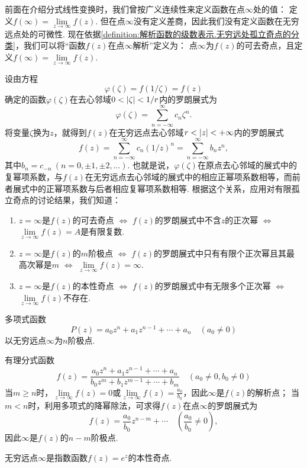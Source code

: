前面在介绍分式线性变换时，我们曾按广义连续性来定义函数在点\(\infty\)处的值：
定义\(f(\infty) = \lim\limits_{z\to\infty} f(z)\).
但在点\(\infty\)没有定义差商，因此我们没有定义函数在无穷远点处的可微性.
现在依据\cref{definition:解析函数的级数表示.无穷远处孤立奇点的分类}，我们可以将“函数\(f(z)\)在点\(\infty\)解析”定义为：
点\(\infty\)为\(f(z)\)的可去奇点，且定义\(f(\infty) = \lim\limits_{z\to\infty} f(z)\).

设由方程\[
\varphi(\zeta) = f(1/\zeta) = f(z)
\]确定的函数\(\varphi(\zeta)\)在去心邻域\(0<\abs{\zeta}<1/r\)内的罗朗展式为\[
\varphi(\zeta) = \sum\limits_{n=-\infty}^{\infty} c_n \zeta^n.
\]将变量\(\zeta\)换为\(z\)，就得到\(f(z)\)在无穷远点去心邻域\(r<\abs{z}<+\infty\)内的罗朗展式\[
f(z) = \sum\limits_{n=-\infty}^{\infty} c_n (1/z)^n
= \sum\limits_{n=-\infty}^{\infty} b_n z^n,
\]其中\(b_n = c_{-n}\ (n=0,\pm1,\pm2,\dotsc)\).
也就是说，\(\varphi(\zeta)\)在原点去心邻域的展式中的复幂项系数，与\(f(z)\)在无穷远点去心邻域的展式中的相应正幂项系数相等，而前者展式中的正幂项系数与后者相应复幂项系数相等.
根据这个关系，应用对有限孤立奇点的讨论结果，我们知道：
\begin{enumerate}
\item \(z=\infty\)是\(f(z)\)的可去奇点 \(\iff\) \(f(z)\)的罗朗展式中不含\(z\)的正次幂 \(\iff\) \(\lim\limits_{z\to\infty} f(z) = A\)是有限复数.
\item \(z=\infty\)是\(f(z)\)的\(m\)阶极点 \(\iff\) \(f(z)\)的罗朗展式中只有有限个正次幂且其最高次幂是\(m\) \(\iff\) \(\lim\limits_{z\to\infty} f(z) = \infty\).
\item \(z=\infty\)是\(f(z)\)的本性奇点 \(\iff\) \(f(z)\)的罗朗展式中有无限多个正次幂 \(\iff\) \(\lim\limits_{z\to\infty} f(z)\)不存在.
\end{enumerate}

\begin{example}
多项式函数\[
P(z) = a_0 z^n + a_1 z^{n-1} + \dotsb + a_n
\quad(a_0\neq0)
\]以无穷远点\(\infty\)为\(n\)阶极点.
\end{example}

\begin{example}
有理分式函数\[
f(z) = \frac{a_0 z^n + a_1 z^{n-1} + \dotsb + a_n}{b_0 z^m + b_1 z^{m-1} + \dotsb + b_m}
\quad(a_0\neq0,b_0\neq0)
\]当\(m \geqslant n\)时，\(\lim\limits_{z\to\infty} f(z) = 0\)或\(\lim\limits_{z\to\infty} f(z) = \frac{a_0}{b_0}\)，因此\(\infty\)是\(f(z)\)的解析点；
当\(m<n\)时，利用多项式的降幂除法，可求得\(f(z)\)在点\(\infty\)的罗朗展式为\[
f(z) = \frac{a_0}{b_0} z^{n-m} + \dotsb
\quad(\frac{a_0}{b_0}\neq0),
\]因此\(\infty\)是\(f(z)\)的\(n-m\)阶极点.
\end{example}

\begin{example}
无穷远点\(\infty\)是指数函数\(f(z) = e^z\)的本性奇点.
\end{example}
